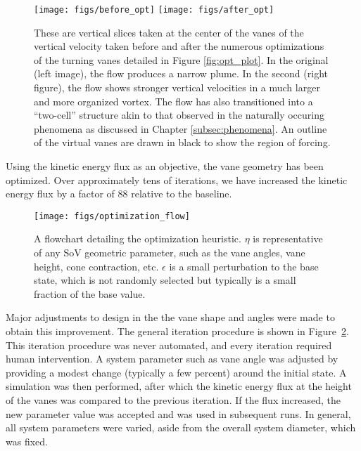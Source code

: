 \begin{figure}[htb]
  \centering
 \texttt{[image: figs/before\_opt]}
 \hfill
 \texttt{[image: figs/after\_opt]} \\
  \caption{These are vertical slices taken at the center of the vanes of
 the vertical velocity taken before and after the numerous optimizations
 of the turning vanes detailed in Figure \ref{fig:opt_plot}. In the
 original (left image), the flow produces a narrow plume. In the second
 (right figure), the flow shows stronger vertical velocities in a much
 larger and more organized vortex. The flow has also transitioned into a
 ``two-cell'' structure akin to that observed in the naturally occuring
 phenomena as discussed in Chapter \ref{subsec:phenomena}. An outline of
 the virtual vanes are drawn in black to show the region of forcing.}
  \label{fig:opt_flow}
\end{figure}

Using the kinetic energy flux as an objective, the vane geometry has
been optimized. Over approximately tens of iterations, we have
increased the kinetic energy flux by a factor of 88 relative to the
baseline. 

\begin{figure}[htb]
 \centering
 \texttt{[image: figs/optimization\_flow]}
 \caption{A flowchart detailing the optimization heuristic. $\eta$ is
 representative of any SoV geometric parameter, such as the vane angles,
 vane height, cone contraction, etc. $\epsilon$ is a small perturbation
 to the base state, which is not randomly selected but typically is a
 small fraction of the base value. }
 \label{fig:opt_image}
\end{figure}


Major adjustments to design in the the vane shape and angles were made
to obtain this improvement. The general iteration procedure is shown in
Figure~\ref{fig:opt_image}. This iteration procedure was never
automated, and every iteration required human intervention. A system 
parameter such as vane angle was adjusted by providing a modest change
(typically a few percent) around the initial state. A simulation was
then performed, after which the kinetic energy flux at the height of the
vanes was compared to the previous iteration. If the flux increased,
the new parameter value was accepted and was used in subsequent runs. In
general, all system parameters were varied, aside from the overall
system diameter, which was fixed. 

